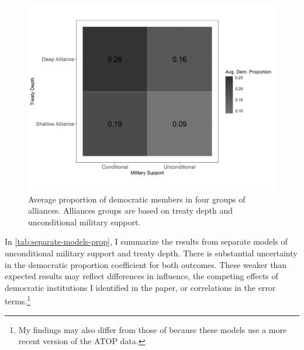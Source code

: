 \documentclass[12pt]{article}
\begin{document}
\begin{figure}
\includegraphics[width=.95\textwidth]{democ-prop-combo.png}  
\caption{Average proportion of democratic members in four groups of alliances. Alliances groups are based on treaty depth and unconditional military support.}
\label{fig:democ-prop-combo}
\end{figure}


In \autoref{tab:separate-models-prop}, I summarize the results from separate models of unconditional military support and treaty depth.
There is substantial uncertainty in the democratic proportion coefficient for both outcomes. 
These weaker than expected results may reflect differences in influence, the competing effects of democratic institutions I identified in the paper, or correlations in the error terms.\footnote{My findings may also differ from those of \citet{Chibaetal2015} because these models use a more recent version of the ATOP data.}  
\end{document}
